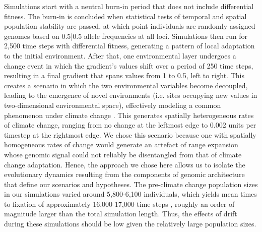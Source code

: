 \documentclass[9pt,twocolumn,twoside,lineno]{new_article}
\begin{document}
Simulations start with a neutral burn-in period that does not include differential fitness.
The burn-in is concluded when statistical tests
of temporal and spatial population stability are passed,
at which point individuals are randomly assigned genomes
based on 0.5|0.5 allele frequencies at all loci.
Simulations then run for 2,500 time steps with differential fitness,
generating a pattern of local adaptation to the initial environment.
After that, one environmental layer undergoes a change 
event in which the gradient’s values shift over a period of 250 time steps,
resulting in a final gradient that spans values from 1 to 0.5, left to right.
This creates a scenario in 
which the two environmental variables become decoupled, leading 
to the emergence of novel environments (i.e. sites occupying new values in 
two-dimensional environmental space), effectively modeling a common 
phenomenon under climate change
\cite{williams_novel_climates,williams_projected_novel_disappearing,fitzpatrick}.
This generates spatially heterogeneous rates of climate change, ranging from no change at the leftmost edge to 0.002 units per timestep at the rightmost edge.
We chose this scenario because one with spatially homogeneous rates of change would generate an artefact of range expansion
whose genomic signal could not reliably be disentangled from that of
climate change adaptation. Hence, the approach we chose here allows us
to isolate the evolutionary dynamics
resulting from the components of genomic architecture
that define our scenarios and hypotheses. The pre-climate change population sizes in our simulations varied around 5,800-6,100 individuals,
which yields mean times to fixation of approximately 16,000-17,000 time steps \cite{wright,terasaki_hart},
roughly an order of magnitude larger than the total simulation length. Thus, the effects of drift during these simulations should be low given the relatively large population sizes.
\end{document}
